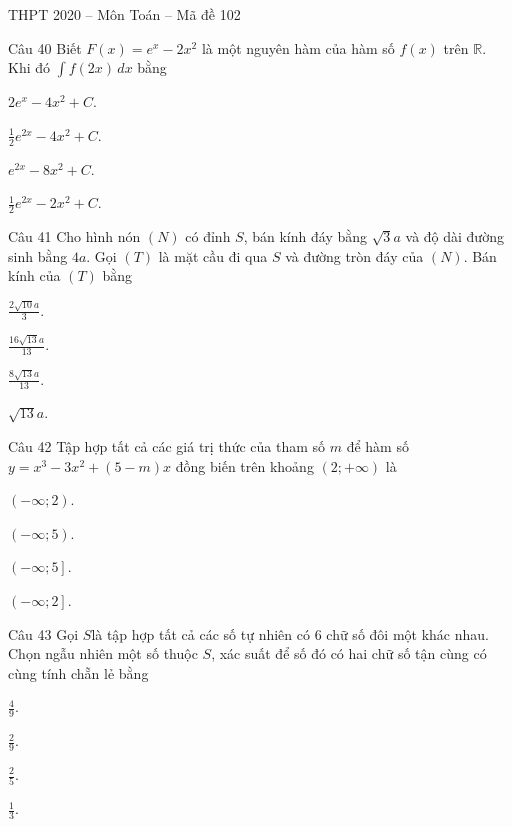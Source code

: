 \documentclass{book}
\begin{document}
\begin{quiz}{THPT 2020 – Môn Toán – Mã đề 102}
\begin{multi}[points=1]{Câu 40}
 Biết $F\left( x \right)={{e}^{x}}-2{{x}^{2}}$ là một nguyên hàm của hàm số $f\left( x \right)$ trên $\mathbb{R}$. Khi đó $\int{f\left( 2x \right)}\,dx$ bằng

\item  $2{{e}^{x}}-4{{x}^{2}}+C$.	
\item*  $\frac{1}{2}{{e}^{2x}}-4{{x}^{2}}+C$.	
\item  ${{e}^{2x}}-8{{x}^{2}}+C$.	
\item  $\frac{1}{2}{{e}^{2x}}-2{{x}^{2}}+C$.
\end{multi}

\begin{multi}[points=1]{Câu 41}
 Cho hình nón $\left( N \right)$ có đỉnh $S$, bán kính đáy bằng $\sqrt{3}a$ và độ dài đường sinh bằng $4a$. Gọi $\left( T \right)$ là mặt cầu đi qua $S$ và đường tròn đáy của $\left( N \right)$. Bán kính của $\left( T \right)$ bằng

\item  $\frac{2\sqrt{10}a}{3}$.	
\item  $\frac{16\sqrt{13}a}{13}$.	
\item*  $\frac{8\sqrt{13}a}{13}$.	
\item  $\sqrt{13}a$.
\end{multi}

\begin{multi}[points=1]{Câu 42}
 Tập hợp tất cả các giá trị thức của tham số $m$ để hàm số $y={{x}^{3}}-3{{x}^{2}}+\left( 5-m \right)x$ đồng biến trên khoảng $\left( 2;+\infty  \right)$ là

\item  $\left( -\infty ;2 \right)$.	
\item  $\left( -\infty ;5 \right)$.	
\item*  $\left( -\infty ;5 \right]$.	
\item  $\left( -\infty ;2 \right]$.
\end{multi}

\begin{multi}[points=1]{Câu 43}
 Gọi $S$là tập hợp tất cả các số tự nhiên có 6 chữ số đôi một khác nhau. Chọn ngẫu nhiên một số thuộc $S$, xác suất để số đó có hai chữ số tận cùng có cùng tính chẵn lẻ bằng

\item*  $\frac{4}{9}$.	
\item  $\frac{2}{9}$.	
\item  $\frac{2}{5}$.	
\item  $\frac{1}{3}$.
\end{multi}


\end{quiz}
\end{document}
